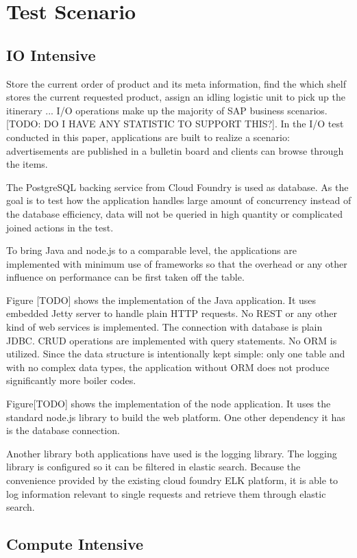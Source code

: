 \chapter{Test Scenario}
\section{IO Intensive}
Store the current order of product and its meta information, find the which shelf stores the current requested product, assign an idling logistic unit to pick up the itinerary ... I/O operations make up the majority of SAP business scenarios.  [TODO: DO I HAVE ANY STATISTIC TO SUPPORT THIS?]. In the I/O test conducted in this paper, applications are built to realize a scenario: advertisements are published in a bulletin board and clients can browse through the items. 

The PostgreSQL backing service from Cloud Foundry is used as database. As the goal is to test how the application handles large amount of concurrency instead of the database efficiency, data will not be queried in high quantity or complicated joined actions  in the test. 

To bring Java and node.js to a comparable level, the applications are implemented with minimum use of frameworks so that the overhead or any other influence on performance can be first taken off the table. 

Figure [TODO] shows the implementation of the Java application. It uses embedded Jetty server to handle plain HTTP requests. No REST or any other kind of web services is implemented. The connection with database is plain JDBC. CRUD operations are implemented with query statements. No ORM is utilized. Since the data structure is intentionally kept simple: only one table and with no complex data types, the application without ORM does not produce significantly more boiler codes.
 
Figure[TODO] shows the implementation of the node application. It uses the standard node.js library to build the web platform. One other dependency it has is the database connection. 

Another library both applications have used is the logging library. The logging library is configured so it can be filtered in elastic search. Because the convenience provided by the existing cloud foundry ELK platform, it is able to log information relevant to single requests and retrieve them through elastic search. 
     
\section{Compute Intensive}
